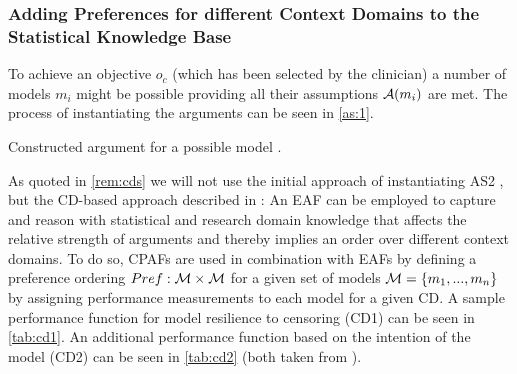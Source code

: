 \subsubsection{Adding Preferences for different Context Domains to the Statistical Knowledge Base}
\label{sub:preferences}

To achieve an objective $o_c$ (which has been selected by the clinician) a number of models $m_i$ might be possible providing all their assumptions $\mathcal{A}(m_i)$ are met. The process of instantiating the arguments can be seen in \cref{as:1}.

\begin{as}[tb]
	\centering
	\caption{Constructed argument for a possible model \cite{sassoon2014}. 	\label{as:1}}

\end{as}

As quoted in \cref{rem:cds} we will not use the initial approach of instantiating AS2 \cite{sassoon2014}, but the \gls{CD}-based approach described in \cite{sassoon2016,sassoon2016CD}: An \gls{EAF} can be employed to capture and reason with statistical and research domain knowledge that affects the relative strength of arguments and thereby implies an order over different context domains. To do so, \glspl{CPAF} are used in combination with \glspl{EAF} by defining a preference ordering $Pref : \mathcal{M} \times \mathcal{M}$ for a given set of models $\mathcal{M} = \{m_1, ..., m_n\}$ by assigning performance measurements to each model for a given \gls{CD}. A sample performance function for model resilience to censoring (CD1) can be seen in \autoref{tab:cd1}. An additional performance function based on the intention of the model (CD2) can be seen in \autoref{tab:cd2} (both taken from \cite{sassoon2016CD}).


